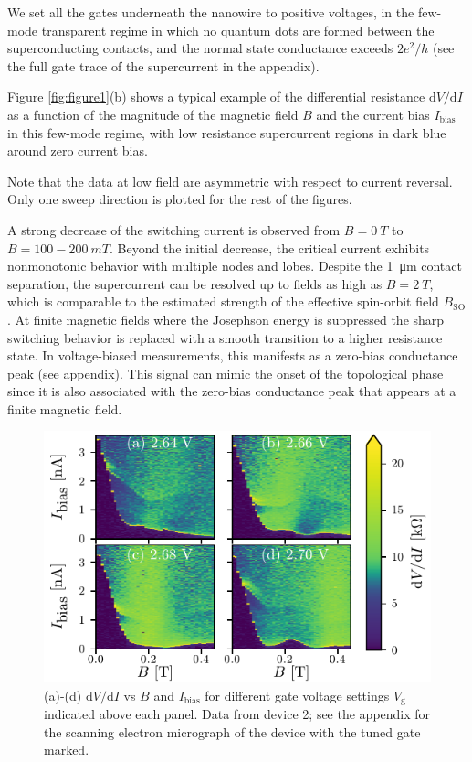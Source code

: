 We set all the gates underneath the nanowire to positive voltages, in the few-mode transparent regime in which no quantum dots are formed between the superconducting contacts, and the normal state conductance exceeds $2e^2/h$ (see the full gate trace of the supercurrent in the appendix).

Figure \ref{fig:figure1}(b) shows a typical example of the differential resistance $\mathrm{d}V/\mathrm{d}I$ as a function of the magnitude of the magnetic field $B$ and the current bias $I_\mathrm{bias}$ in this few-mode regime, with low resistance supercurrent regions in dark blue around zero current bias.

Note that the data at low field are asymmetric with respect to current reversal. Only one sweep direction is plotted for the rest of the figures.

A strong decrease of the switching current is observed from $B=\SI{0}{T}$ to $B=100-\SI{200}{mT}$.
Beyond the initial decrease, the critical current exhibits nonmonotonic behavior with multiple nodes and lobes.
Despite the \SI{1}{\micro \meter} contact separation, the supercurrent can be resolved up to fields as high as $B=\SI{2}{T}$, which is comparable to the estimated strength of the effective spin-orbit field $B_\mathrm{SO}$.
At finite magnetic fields where the Josephson energy is suppressed the sharp switching behavior is replaced with a smooth transition to a higher resistance state.
In voltage-biased measurements, this manifests as a zero-bias conductance peak (see appendix).
This signal can mimic the onset of the topological phase since it is also associated with the zero-bias conductance peak that appears at a finite magnetic field.

\begin{figure}[t]
\includegraphics[width=\columnwidth]{chapter_supercurrent/figures/fig2.pdf}
\caption{(a)-(d) $\mathrm{d}V/\mathrm{d}I$ vs $B$ and $I_\mathrm{bias}$ for different gate voltage settings $V_\mathrm{g}$ indicated above each panel.  Data from device 2; see the appendix for the scanning electron micrograph of the device with the tuned gate marked.}
\label{fig:figure2}
\end{figure}

